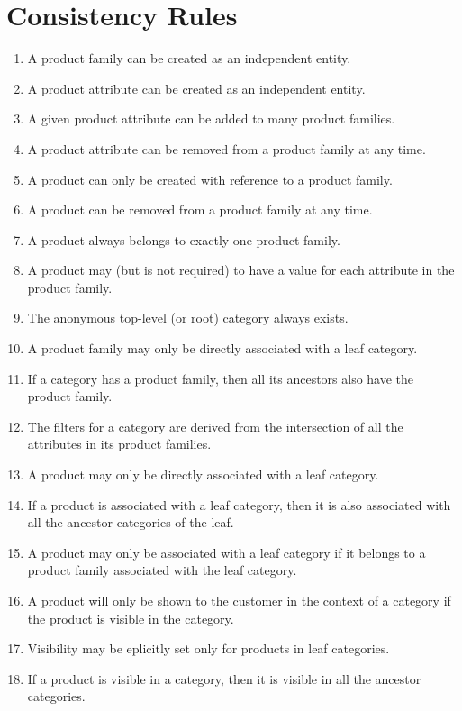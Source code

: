 \documentclass[letterpaper, 12pt]{article}
\begin{document}
\section{Consistency Rules}
\begin{enumerate}
\item A product family can be created as an independent entity.
\item A product attribute can be created as an independent entity.  
\item A given product attribute can be added to many product families.
\item A product attribute can be removed from a product family at any time.
\item A product can only be created with reference to a product family.
\item A product can be removed from a product family at any time.
\item A product always belongs to exactly one product family.
\item A product may (but is not required) to have a value for each attribute in the product family.
\item The anonymous top-level (or root) category always exists.
\item A product family may only be directly associated with a leaf category.
\item If a category has a product family, then all its ancestors also have the product family. 
\item The filters for a category are derived from the intersection of all the attributes in its product families.
\item A product may only be directly associated with a leaf category.
\item If a product is associated with a leaf category, then it is also associated with all the ancestor categories of the leaf.
\item A product may only be associated with a leaf category if it belongs to a product family associated with the leaf category.
\item A product will only be shown to the customer in the context of a category if the product is visible in the category.
\item Visibility may be eplicitly set only for products in leaf categories.
\item If a product is visible in a category, then it is visible in all the ancestor categories.
\end{enumerate}
\end{document}
